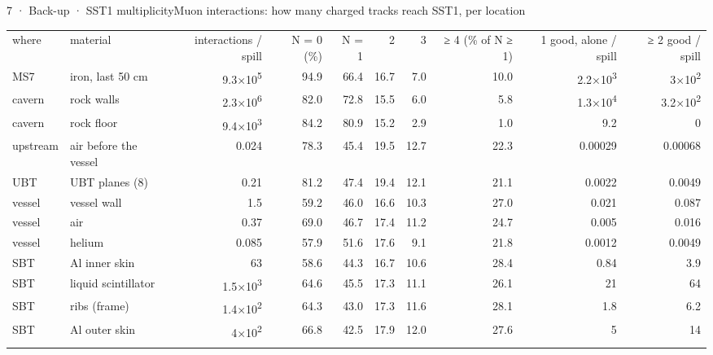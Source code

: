 
\begin{btframe}{7 · Back-up · SST1 multiplicity}{Muon interactions: how many charged tracks reach SST1, per location}
{\fontsize{4.9pt}{6.3pt}\selectfont\setlength{\tabcolsep}{2.8pt}\renewcommand{\arraystretch}{1.32}
\begin{tabular}{llrrrrrrrr}
\textcolor{muted}{where} & \textcolor{muted}{material} & \textcolor{muted}{interactions / spill} & \textcolor{muted}{N = 0 (\%)} & \textcolor{muted}{N = 1} & \textcolor{muted}{2} & \textcolor{muted}{3} & \textcolor{muted}{≥ 4 (\% of N ≥ 1)} & \textcolor{muted}{1 good, alone / spill} & \textcolor{muted}{≥ 2 good / spill} \\\headrule
MS7 & iron, last 50 cm & 9.3×10\textsuperscript{5} & 94.9 & 66.4 & 16.7 & 7.0 & 10.0 & 2.2×10\textsuperscript{3} & 3×10\textsuperscript{2} \\\rowrule
cavern & rock walls & 2.3×10\textsuperscript{6} & 82.0 & 72.8 & 15.5 & 6.0 & 5.8 & 1.3×10\textsuperscript{4} & 3.2×10\textsuperscript{2} \\\rowrule
cavern & rock floor & 9.4×10\textsuperscript{3} & 84.2 & 80.9 & 15.2 & 2.9 & 1.0 & 9.2 & 0 \\\rowrule
upstream & air before the vessel & 0.024 & 78.3 & 45.4 & 19.5 & 12.7 & 22.3 & 0.00029 & 0.00068 \\\rowrule
UBT & UBT planes (8) & 0.21 & 81.2 & 47.4 & 19.4 & 12.1 & 21.1 & 0.0022 & 0.0049 \\\rowrule
vessel & vessel wall & 1.5 & 59.2 & 46.0 & 16.6 & 10.3 & 27.0 & 0.021 & 0.087 \\\rowrule
vessel & air & 0.37 & 69.0 & 46.7 & 17.4 & 11.2 & 24.7 & 0.005 & 0.016 \\\rowrule
vessel & helium & 0.085 & 57.9 & 51.6 & 17.6 & 9.1 & 21.8 & 0.0012 & 0.0049 \\\rowrule
SBT & Al inner skin & 63 & 58.6 & 44.3 & 16.7 & 10.6 & 28.4 & 0.84 & 3.9 \\\rowrule
SBT & liquid scintillator & 1.5×10\textsuperscript{3} & 64.6 & 45.5 & 17.3 & 11.1 & 26.1 & 21 & 64 \\\rowrule
SBT & ribs (frame) & 1.4×10\textsuperscript{2} & 64.3 & 43.0 & 17.3 & 11.6 & 28.1 & 1.8 & 6.2 \\\rowrule
SBT & Al outer skin & 4×10\textsuperscript{2} & 66.8 & 42.5 & 17.9 & 12.0 & 27.6 & 5 & 14 \\\rowrule
\end{tabular}\par}

\end{btframe}
